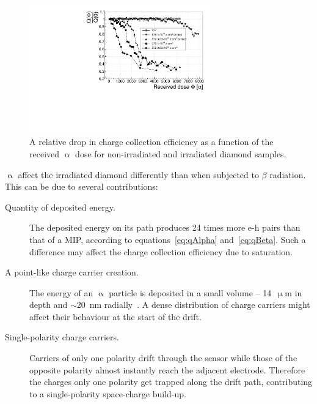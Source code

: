 \begin{figure}[!t]
\begin{center}
\includegraphics[width=0.7\textwidth]{03_measurement_results/scripts/plots/amplvstimecx4}
\caption{A relative drop in charge collection efficiency as a function of the received $\upalpha$ dose for non-irradiated and irradiated diamond samples.}
\label{fig:longtermcx}
\end{center}
\end{figure}

$\upalpha$ affect the irradiated diamond differently than when subjected to $\beta$ radiation. This can be due to several contributions:
\begin{description} 
\item[Quantity of deposited energy.] The deposited energy on its path produces 24 times more e-h pairs than that of a MIP, according to equations~\ref{eq:qAlpha} and~\ref{eq:qBeta}. Such a difference may affect the charge collection efficiency due to saturation.
\item[A point-like charge carrier creation.] The energy of an $\upalpha$ particle is deposited in a small volume -- 14~$\upmu$m in depth and $\sim$20~nm radially~\cite{Jansen:1956431}. A dense distribution of charge carriers  might affect their behaviour at the start of the drift.
\item[Single-polarity charge carriers.] Carriers of only one polarity drift through the sensor while those of the opposite polarity almost instantly reach the adjacent electrode. Therefore the charges only one polarity get trapped along the drift path, contributing to a single-polarity space-charge build-up.
\end{description}


